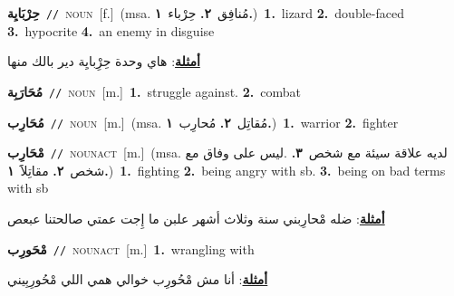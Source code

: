 \documentclass[10pt,a4paper,twoside]{article} %
\begin{document}
\begin{multicols}{2}
{\setlength\topsep{0pt}\textbf{\foreignlanguage{arabic}{حِرْبَايِة}}\ {\color{gray}\texttt{//}\color{black}}\ \textsc{noun}\ [f.]\ \color{gray}(msa. \foreignlanguage{arabic}{مُنافِق}~\foreignlanguage{arabic}{\textbf{٢.}}  \foreignlanguage{arabic}{حِرْباء}~\foreignlanguage{arabic}{\textbf{١.}})\color{black}\ \textbf{1.}~lizard  \textbf{2.}~double-faced  \textbf{3.}~hypocrite  \textbf{4.}~an enemy in disguise\  \begin{flushright}\color{gray}\foreignlanguage{arabic}{\textbf{\underline{\foreignlanguage{arabic}{أمثلة}}}: هاي وحدة حِرِْبايِة دير بالك منها}\end{flushright}\color{black}} \vspace{2mm}

{\setlength\topsep{0pt}\textbf{\foreignlanguage{arabic}{مُحَارَبِة}}\ {\color{gray}\texttt{//}\color{black}}\ \textsc{noun}\ [m.]\ \textbf{1.}~struggle against.  \textbf{2.}~combat\ } \vspace{2mm}

{\setlength\topsep{0pt}\textbf{\foreignlanguage{arabic}{مُحَارِب}}\ {\color{gray}\texttt{//}\color{black}}\ \textsc{noun}\ [m.]\ \color{gray}(msa. \foreignlanguage{arabic}{مُقاتِل}~\foreignlanguage{arabic}{\textbf{٢.}}  \foreignlanguage{arabic}{مُحارِب}~\foreignlanguage{arabic}{\textbf{١.}})\color{black}\ \textbf{1.}~warrior  \textbf{2.}~fighter\ } \vspace{2mm}

{\setlength\topsep{0pt}\textbf{\foreignlanguage{arabic}{مْحَارِب}}\ {\color{gray}\texttt{//}\color{black}}\ \textsc{noun\textunderscore act}\ [m.]\ \color{gray}(msa. \foreignlanguage{arabic}{لديه علاقة سيئة مع شخص}~\foreignlanguage{arabic}{\textbf{٣.}}  .\foreignlanguage{arabic}{ليس على وفاق مع شخص}~\foreignlanguage{arabic}{\textbf{٢.}}  \foreignlanguage{arabic}{مقاتِلاََ}~\foreignlanguage{arabic}{\textbf{١.}})\color{black}\ \textbf{1.}~fighting  \textbf{2.}~being angry with sb.  \textbf{3.}~being on bad terms with sb\  \begin{flushright}\color{gray}\foreignlanguage{arabic}{\textbf{\underline{\foreignlanguage{arabic}{أمثلة}}}: ضله مْحارِبني سنة وثلاث أشهر علبن ما إِجت عمتي صالحتنا عبعص}\end{flushright}\color{black}} \vspace{2mm}

{\setlength\topsep{0pt}\textbf{\foreignlanguage{arabic}{مْحَورِب}}\ {\color{gray}\texttt{//}\color{black}}\ \textsc{noun\textunderscore act}\ [m.]\ \textbf{1.}~wrangling with\  \begin{flushright}\color{gray}\foreignlanguage{arabic}{\textbf{\underline{\foreignlanguage{arabic}{أمثلة}}}: أنا مش مْحُورِب خوالي همي اللي مْحُورِبِيني}\end{flushright}\color{black}} \vspace{2mm}


\end{multicols}
\end{document}
